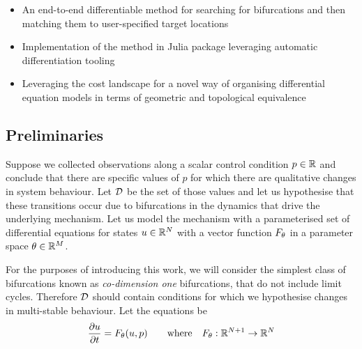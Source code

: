 \begin{itemize}
    \item An end-to-end differentiable method for searching for bifurcations and then matching them to user-specified target locations
    \item Implementation of the method in Julia package leveraging automatic differentiation tooling
    \item Leveraging the cost landscape for a novel way of organising differential equation models in terms of geometric and topological equivalence
\end{itemize}

\subsection{Preliminaries}

Suppose we collected observations along a scalar control condition $p\in\mathbb{R}$ and conclude that there are specific values of $p$ for which there are qualitative changes in system behaviour. Let $\mathcal{D}$ be the set of those values and let us hypothesise that these transitions occur due to bifurcations in the dynamics that drive the underlying mechanism. Let us model the mechanism with a parameterised set of differential equations for states $u\in\mathbb{R}^N$ with a vector function $F_{\theta}$ in a parameter space $\theta\in\mathbb{R}^M$.

For the purposes of introducing this work, we will consider the simplest class of bifurcations known as \textit{co-dimension one} bifurcations, that do not include limit cycles. Therefore $\mathcal{D}$ should contain conditions for which we hypothesise changes in multi-stable behaviour. Let the equations be
\begin{align}
	\frac{\partial u}{\partial t}=F_{\theta}(u,p)
	\qquad\mathrm{where}\quad
	F_{\theta} : \mathbb{R}^{N+1}\rightarrow\mathbb{R}^N
	\label{eq:model}
\end{align}

